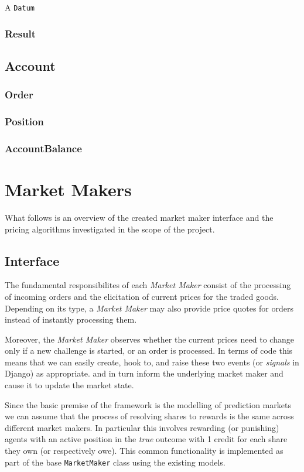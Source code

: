 \documentclass[bsc,frontabs,twoside,singlespacing,parskip,deptreport]{infthesis}     %
\begin{document}
	A {\tt Datum} 

\subsubsection{Result}


\subsection{Account}

\subsubsection{Order}

\subsubsection{Position}

\subsubsection{AccountBalance}


\section{Market Makers}
    What follows is an overview of the created market maker interface and the pricing algorithms investigated in the scope of the project.

\subsection{Interface}

The fundamental responsibilites of each {\em Market Maker} consist of the processing of incoming orders and the elicitation of current prices for the traded goods. Depending on its type, a {\em Market Maker} may also provide price quotes for orders instead of instantly processing them. 

Moreover, the {\em Market Maker} observes whether the current prices need to change only if a new challenge is started, or an order is processed. In terms of code this means that we can easily create, hook to, and raise these two events (or {\it signals} in Django) as appropriate.   and in turn inform the underlying market maker and cause it to update the market state.  

Since the basic premise of the framework is the modelling of prediction markets we can assume that the process of resolving shares to rewards is the same across different market makers. In particular this involves rewarding (or punishing) agents with an active position in the {\it true} outcome with 1 credit for each share they own (or respectively owe). This common functionality is implemented as part of the base {\tt MarketMaker} class using the existing models. 
\end{document}
